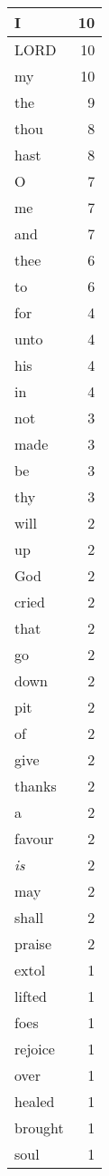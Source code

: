 \begin{center}
\begin{longtable}{l|r}
\hline \hline
\endlastfoot
I & 10 \\ \hline
LORD & 10 \\ \hline
my & 10 \\ \hline
the & 9 \\ \hline
thou & 8 \\ \hline
hast & 8 \\ \hline
O & 7 \\ \hline
me & 7 \\ \hline
and & 7 \\ \hline
thee & 6 \\ \hline
to & 6 \\ \hline
for & 4 \\ \hline
unto & 4 \\ \hline
his & 4 \\ \hline
in & 4 \\ \hline
not & 3 \\ \hline
made & 3 \\ \hline
be & 3 \\ \hline
thy & 3 \\ \hline
will & 2 \\ \hline
up & 2 \\ \hline
God & 2 \\ \hline
cried & 2 \\ \hline
that & 2 \\ \hline
go & 2 \\ \hline
down & 2 \\ \hline
pit & 2 \\ \hline
of & 2 \\ \hline
give & 2 \\ \hline
thanks & 2 \\ \hline
a & 2 \\ \hline
favour & 2 \\ \hline
\emph{is} & 2 \\ \hline
may & 2 \\ \hline
shall & 2 \\ \hline
praise & 2 \\ \hline
extol & 1 \\ \hline
lifted & 1 \\ \hline
foes & 1 \\ \hline
rejoice & 1 \\ \hline
over & 1 \\ \hline
healed & 1 \\ \hline
brought & 1 \\ \hline
soul & 1 \\ \hline

\end{longtable}
\end{center}
